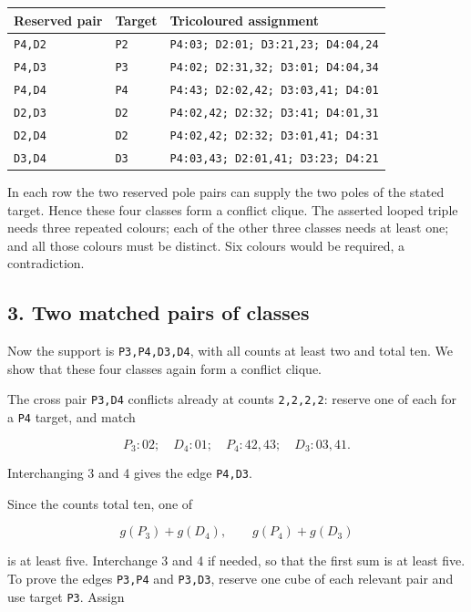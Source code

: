 \documentclass[
  10pt,
]{article}
\begin{document}
\begin{longtable}[]{@{}lll@{}}
\toprule\noalign{}
Reserved pair & Target & Tricoloured assignment \\
\midrule\noalign{}
\endhead
\bottomrule\noalign{}
\endlastfoot
\texttt{P4,D2} & \texttt{P2} &
\texttt{P4:03;\ D2:01;\ D3:21,23;\ D4:04,24} \\
\texttt{P4,D3} & \texttt{P3} &
\texttt{P4:02;\ D2:31,32;\ D3:01;\ D4:04,34} \\
\texttt{P4,D4} & \texttt{P4} &
\texttt{P4:43;\ D2:02,42;\ D3:03,41;\ D4:01} \\
\texttt{D2,D3} & \texttt{D2} &
\texttt{P4:02,42;\ D2:32;\ D3:41;\ D4:01,31} \\
\texttt{D2,D4} & \texttt{D2} &
\texttt{P4:02,42;\ D2:32;\ D3:01,41;\ D4:31} \\
\texttt{D3,D4} & \texttt{D3} &
\texttt{P4:03,43;\ D2:01,41;\ D3:23;\ D4:21} \\
\end{longtable}

In each row the two reserved pole pairs can supply the two poles of the
stated target. Hence these four classes form a conflict clique. The
asserted looped triple needs three repeated colours; each of the other
three classes needs at least one; and all those colours must be
distinct. Six colours would be required, a contradiction.

\hypertarget{two-matched-pairs-of-classes}{%
\subsection*{3. Two matched pairs of
classes}\label{two-matched-pairs-of-classes}}

Now the support is \texttt{P3,P4,D3,D4}, with all counts at least two
and total ten. We show that these four classes again form a conflict
clique.

The cross pair \texttt{P3,D4} conflicts already at counts
\texttt{2,2,2,2}: reserve one of each for a \texttt{P4} target, and
match

\[
P_3:02;\quad D_4:01;\quad P_4:42,43;\quad D_3:03,41.
\]

Interchanging 3 and 4 gives the edge \texttt{P4,D3}.

Since the counts total ten, one of

\[
g(P_3)+g(D_4),\qquad g(P_4)+g(D_3)
\]

is at least five. Interchange 3 and 4 if needed, so that the first sum
is at least five. To prove the edges \texttt{P3,P4} and \texttt{P3,D3},
reserve one cube of each relevant pair and use target \texttt{P3}.
Assign
\end{document}
